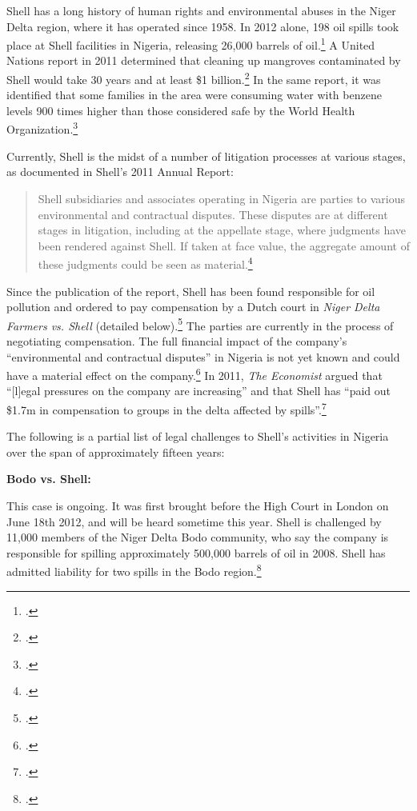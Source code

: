 Shell has a long history of human rights and environmental abuses in the Niger Delta region, where it has operated since 1958.
In 2012 alone, 198 oil spills took place at Shell facilities in Nigeria, releasing 26,000 barrels of oil.\footcite{DutchResponsible}
A United Nations report in 2011 determined that cleaning up mangroves contaminated by Shell would take 30 years and at least \$1 billion.\footcite{Ogoniland}
In the same report, it was identified that some families in the area were consuming water with benzene levels 900 times higher than those considered safe by the World Health Organization.\footcite{OilSpoils}



Currently, Shell is the midst of a number of litigation processes at various stages, as documented in Shell's 2011 Annual Report:
\begin{quote}
Shell subsidiaries and associates operating in Nigeria are parties to various environmental and contractual disputes.
These disputes are at different stages in litigation, including at the appellate stage, where judgments have been rendered against Shell. 
If taken at face value, the aggregate amount of these judgments could be seen as material.\footcite[][P.138]{Shell_2011}
\end{quote}
Since the publication of the report, Shell has been found responsible for oil pollution and ordered to pay compensation by a Dutch court in \emph{Niger Delta Farmers vs. Shell} (detailed below).\footcite[See also:][]{DutchResponsible}
The parties are currently in the process of negotiating compensation.
The full financial impact of the company's ``environmental and contractual disputes'' in Nigeria is not yet known and could have a material effect on the company.\footcite[][p. 139]{Shell_2011}
In 2011, \emph{The Economist} argued that ``[l]egal pressures on the company are increasing'' and that Shell has ``paid out \$1.7m in compensation to groups in the delta affected by spills''.\footcite{OilSpoils}


The following is a partial list of legal challenges to Shell's activities in Nigeria over the span of approximately fifteen years:



\textbf{Bodo vs. Shell:}



This case is ongoing. 
It was first brought before the High Court in London on June 18th 2012, and will be heard sometime this year. 
Shell is challenged by 11,000 members of the Niger Delta Bodo community, who say the company is responsible for spilling approximately 500,000 barrels of oil in 2008. 
Shell has admitted liability for two spills in the Bodo region.\footcite{DutchResponsible}



